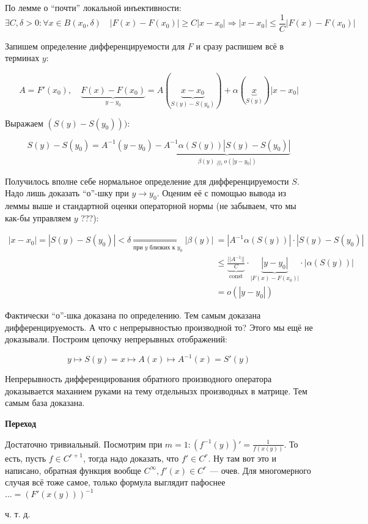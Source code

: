 \documentclass{article}
\DeclareMathOperator{\const}{const}
\begin{document}
По лемме о ``почти'' локальной инъективности:
\[\exists C, \delta > 0: \forall x \in B(x_0, \delta) \quad |F(x) - F(x_0)| \ge C|x - x_0| \Rightarrow |x - x_0| \le \frac{1}{C}|F(x) - F(x_0)|\]

Запишем определение дифференцируемости для $F$ и сразу распишем всё в терминах $y$:

\[A = F'(x_0), \quad \underbrace{F(x) - F(x_0)}_{y - y_0} = A(\underbrace{x - x_0}_{S(y) - S(y_0)}) + \alpha(\underbrace{x}_{S(y)})|x - x_0|\]

Выражаем $(S(y) - S(y_0)))$:

\[S(y) - S(y_0) = A^{-1}(y - y_0) - \underbrace{A^{-1}\alpha(S(y))|S(y) - S(y_0)|}_{\beta(y) \underset{???}{=} o(|y - y_0|)}\]

Получилось вполне себе нормальное определение для дифференцируемости $S$. Надо лишь доказать ``о''-шку при $y \rightarrow y_0$. Оценим её с помощью вывода из леммы выше и стандартной оценки операторной нормы (не забываем, что мы как-бы управляем $y$ ???):

\begin{align*}
    |x - x_0| = |S(y) - S(y_0)| < \delta \underset{\text{при }y\text{ близких к }y_0}{\Rightarrow} |\beta(y)| &= |A^{-1}\alpha(S(y))|\cdot|S(y) - S(y_0)| \\
    &\le \underbrace{\frac{||A^{-1}||}{C}}_{\const}\cdot\underbrace{|y - y_0|}_{|F(x) - F(x_0)|}\cdot|\alpha(S(y))| \\
    &= o(|y - y_0|)
\end{align*}

Фактически ``о''-шка доказана по определению. Тем самым доказана дифференцируемость. А что с непрерывностью производной то? Этого мы ещё не доказывали. Построим цепочку непрерывных отображений:

\[y \mapsto S(y) = x \mapsto A(x) \mapsto A^{-1}(x) = S'(y)\]

Непрерывность дифференцирования обратного производного оператора доказывается маханием руками на тему отдельнызх производных в матрице. Тем самым база доказана.

\textbf{Переход}

Достаточно тривиальный. Посмотрим при $m = 1: (f^{-1}(y))' = \frac{1}{f(x(y))}$. То есть, пусть $f \in C^{r + 1}$, тогда надо доказать, что $f' \in C^r$. Ну там вот это и написано, обратная функция вообще $C^\infty, f'(x) \in C^r$ --- очев. Для многомерного случая всё тоже самое, только формула выглядит пафоснее $\ldots = (F'(x(y)))^{-1}$

ч. т. д.
\end{document}
